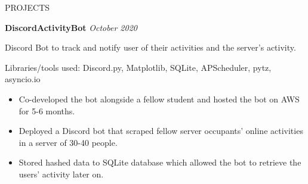 \documentclass{ResumeFormat} %
\begin{document}
\begin{rSection}{PROJECTS}
\item \textbf{DiscordActivityBot} {} \hfill {\emph{October 2020}}

Discord Bot to track and notify user of their activities and the server’s activity.

Libraries/tools used: Discord.py, Matplotlib, SQLite, APScheduler, pytz, asyncio.io
\begin{itemize}
    \itemsep -3pt {}
     \item Co-developed the bot alongside a fellow student and hosted the bot on AWS for 5-6 months.
     \item Deployed a Discord bot that scraped fellow server occupants’ online activities in a server of 30-40 people.
     \item Stored hashed data to SQLite database which allowed the bot to retrieve the users' activity later on.
 \end{itemize}
\end{rSection} 





 
\end{document}

